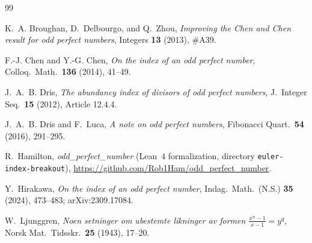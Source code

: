 \documentclass[11pt]{amsart}
\theoremstyle{definition}
\theoremstyle{remark}
\begin{document}
\begin{thebibliography}{99}

K.~A. Broughan, D.~Delbourgo, and Q.~Zhou, \emph{Improving the Chen and Chen result for odd perfect numbers}, Integers \textbf{13} (2013), \#A39.

F.-J. Chen and Y.-G. Chen, \emph{On the index of an odd perfect number}, Colloq.\ Math.\ \textbf{136} (2014), 41--49.

J.~A.~B. Dris, \emph{The abundancy index of divisors of odd perfect numbers}, J.\ Integer Seq.\ \textbf{15} (2012), Article 12.4.4.

J.~A.~B. Dris and F.~Luca, \emph{A note on odd perfect numbers}, Fibonacci Quart.\ \textbf{54} (2016), 291--295.

R.~Hamilton, \emph{odd\_perfect\_number} (Lean~4 formalization, directory \texttt{euler-index-breakout}), \url{https://github.com/Rob1Ham/odd_perfect_number}.

Y.~Hirakawa, \emph{On the index of an odd perfect number}, Indag.\ Math.\ (N.S.) \textbf{35} (2024), 473--483; arXiv:2309.17084.

W.~Ljunggren, \emph{Noen setninger om ubestemte likninger av formen $\frac{x^n - 1}{x - 1} = y^q$}, Norsk Mat.\ Tidsskr.\ \textbf{25} (1943), 17--20.

\end{thebibliography}
\end{document}
